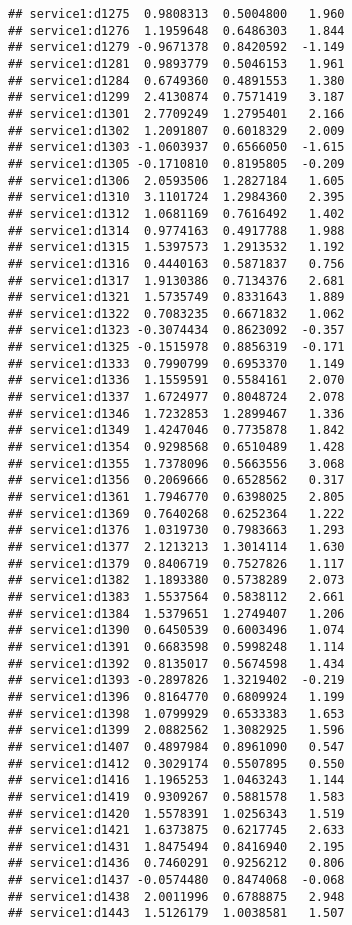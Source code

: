 \documentclass[
]{article}
\begin{document}
\begin{verbatim}
## service1:d1275  0.9808313  0.5004800   1.960
## service1:d1276  1.1959648  0.6486303   1.844
## service1:d1279 -0.9671378  0.8420592  -1.149
## service1:d1281  0.9893779  0.5046153   1.961
## service1:d1284  0.6749360  0.4891553   1.380
## service1:d1299  2.4130874  0.7571419   3.187
## service1:d1301  2.7709249  1.2795401   2.166
## service1:d1302  1.2091807  0.6018329   2.009
## service1:d1303 -1.0603937  0.6566050  -1.615
## service1:d1305 -0.1710810  0.8195805  -0.209
## service1:d1306  2.0593506  1.2827184   1.605
## service1:d1310  3.1101724  1.2984360   2.395
## service1:d1312  1.0681169  0.7616492   1.402
## service1:d1314  0.9774163  0.4917788   1.988
## service1:d1315  1.5397573  1.2913532   1.192
## service1:d1316  0.4440163  0.5871837   0.756
## service1:d1317  1.9130386  0.7134376   2.681
## service1:d1321  1.5735749  0.8331643   1.889
## service1:d1322  0.7083235  0.6671832   1.062
## service1:d1323 -0.3074434  0.8623092  -0.357
## service1:d1325 -0.1515978  0.8856319  -0.171
## service1:d1333  0.7990799  0.6953370   1.149
## service1:d1336  1.1559591  0.5584161   2.070
## service1:d1337  1.6724977  0.8048724   2.078
## service1:d1346  1.7232853  1.2899467   1.336
## service1:d1349  1.4247046  0.7735878   1.842
## service1:d1354  0.9298568  0.6510489   1.428
## service1:d1355  1.7378096  0.5663556   3.068
## service1:d1356  0.2069666  0.6528562   0.317
## service1:d1361  1.7946770  0.6398025   2.805
## service1:d1369  0.7640268  0.6252364   1.222
## service1:d1376  1.0319730  0.7983663   1.293
## service1:d1377  2.1213213  1.3014114   1.630
## service1:d1379  0.8406719  0.7527826   1.117
## service1:d1382  1.1893380  0.5738289   2.073
## service1:d1383  1.5537564  0.5838112   2.661
## service1:d1384  1.5379651  1.2749407   1.206
## service1:d1390  0.6450539  0.6003496   1.074
## service1:d1391  0.6683598  0.5998248   1.114
## service1:d1392  0.8135017  0.5674598   1.434
## service1:d1393 -0.2897826  1.3219402  -0.219
## service1:d1396  0.8164770  0.6809924   1.199
## service1:d1398  1.0799929  0.6533383   1.653
## service1:d1399  2.0882562  1.3082925   1.596
## service1:d1407  0.4897984  0.8961090   0.547
## service1:d1412  0.3029174  0.5507895   0.550
## service1:d1416  1.1965253  1.0463243   1.144
## service1:d1419  0.9309267  0.5881578   1.583
## service1:d1420  1.5578391  1.0256343   1.519
## service1:d1421  1.6373875  0.6217745   2.633
## service1:d1431  1.8475494  0.8416940   2.195
## service1:d1436  0.7460291  0.9256212   0.806
## service1:d1437 -0.0574480  0.8474068  -0.068
## service1:d1438  2.0011996  0.6788875   2.948
## service1:d1443  1.5126179  1.0038581   1.507

\end{verbatim}
\end{document}
